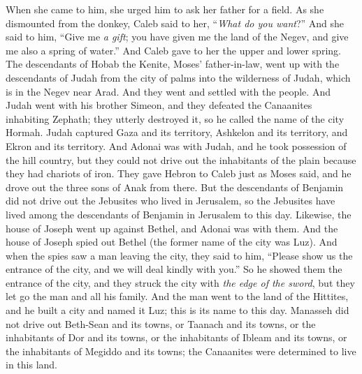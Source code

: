 \begin{biblechapter}
\verse When she came to him, she urged him to ask her father for a field. As she dismounted from the donkey, Caleb said to her, “\textit{What do you want}?”
\verse And she said to him, “Give me \textit{a gift}; you have given me the land of the Negev, and give me also a spring of water.” And Caleb gave to her the upper and lower spring.
\verse The descendants of Hobab the Kenite, Moses’ father-in-law, went up with the descendants of Judah from the city of palms into the wilderness of Judah, which is in the Negev near Arad. And they went and settled with the people.
\verse And Judah went with his brother Simeon, and they defeated the Canaanites inhabiting Zephath; they utterly destroyed it, so he called the name of the city Hormah.
\verse Judah captured Gaza and its territory, Ashkelon and its territory, and Ekron and its territory.
\verse And Adonai was with Judah, and he took possession of the hill country, but they could not drive out the inhabitants of the plain because they had chariots of iron.
\verse They gave Hebron to Caleb just as Moses said, and he drove out the three sons of Anak from there.
\verse But the descendants of Benjamin did not drive out the Jebusites who lived in Jerusalem, so the Jebusites have lived among the descendants of Benjamin in Jerusalem to this day.
\verse Likewise, the house of Joseph went up against Bethel, and Adonai was with them.
\verse And the house of Joseph spied out Bethel (the former name of the city was Luz).
\verse And when the spies saw a man leaving the city, they said to him, “Please show us the entrance of the city, and we will deal kindly with you.”
\verse So he showed them the entrance of the city, and they struck the city with \textit{the edge of the sword}, but they let go the man and all his family.
\verse And the man went to the land of the Hittites, and he built a city and named it Luz; this is its name to this day.
\verse Manasseh did not drive out Beth-Sean and its towns, or Taanach and its towns, or the inhabitants of Dor and its towns, or the inhabitants of Ibleam and its towns, or the inhabitants of Megiddo and its towns; the Canaanites were determined to live in this land.

\end{biblechapter}

